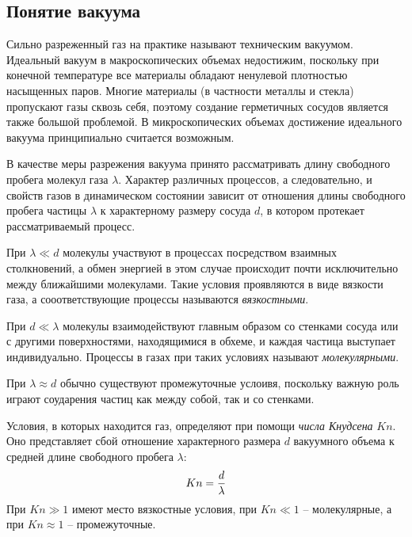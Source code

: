 \documentclass[12pt]{article}
\begin{document}
\subsection*{Понятие вакуума}
\par Сильно разреженный газ на практике называют техническим вакуумом. Идеальный вакуум в макроскопических объемах недостижим, поскольку при конечной температуре все материалы обладают ненулевой плотностью насыщенных паров. Многие материалы (в частности металлы и стекла) пропускают газы сквозь себя, поэтому создание герметичных сосудов является также большой проблемой. В микроскопических объемах достижение идеального вакуума принципиально считается возможным. \par
В качестве меры разрежения вакуума принято рассматривать длину свободного пробега молекул газа $\lambda$. Характер различных процессов, а следовательно, и свойств газов в динамическом состоянии зависит от отношения длины свободного пробега частицы $\lambda$ к характерному размеру сосуда $d$, в котором протекает рассматриваемый процесс. \par
При $\lambda \ll d$ молекулы участвуют в процессах посредством взаимных столкновений, а обмен энергией в этом случае происходит почти исключительно между ближайшими молекулами. Такие условия проявляются в виде вязкости газа, а сооответствующие процессы называются \textit{вязкостными}. \par
При $d \ll \lambda$ молекулы взаимодействуют главным образом со стенками сосуда или с другими поверхностями, находящимися в обхеме, и каждая частица выступает индивидуально. Процессы в газах при таких условиях называют \textit{молекулярными}. \par
При $\lambda \approx d$ обычно существуют промежуточные услоивя, поскольку важную роль играют соударения частиц как между собой, так и со стенками. \par
Условия, в которых находится газ, определяют при помощи \textit{числа Кнудсена} $Kn$. Оно представляет сбой отношение характерного размера $d$ вакуумного объема к средней длине свободного пробега $\lambda$:
\begin{gather}
	Kn = \frac{d}{\lambda} \notag
\end{gather}
При $Kn \gg 1$ имеют место вязкостные условия, при $Kn \ll 1$ -- молекулярные, а при $Kn \approx 1$ -- промежуточные.\par
\end{document}
